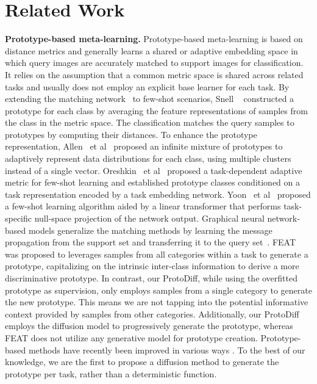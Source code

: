 
\section{Related Work}

\textbf{Prototype-based meta-learning.} 
Prototype-based meta-learning is based on distance metrics and generally learns a shared or adaptive embedding space in which query images are accurately matched to support images for classification. It relies on the assumption that a common metric space is shared across related tasks and usually does not employ an explicit base learner for each task. By extending the matching network~\cite{vinyals2016matching} to few-shot scenarios, Snell \etal~\cite{snell2017prototypical} constructed a prototype for each class by averaging the feature representations of samples from the class in the metric space. The classification matches the query samples to prototypes by computing their distances. To enhance the prototype representation, Allen \ et al~\cite {allen2019infinite} proposed an infinite mixture of prototypes to adaptively represent data distributions for each class, using multiple clusters instead of a single vector. Oreshkin \ et al~\cite {oreshkin2018tadam} proposed a task-dependent adaptive metric for few-shot learning and established prototype classes conditioned on a task representation encoded by a task embedding network. Yoon \ et al~\cite {yoon2019tapnet} proposed a few-shot learning algorithm aided by a linear transformer that performs task-specific null-space projection of the network output. Graphical neural network-based models generalize the matching methods by learning the message propagation from the support set and transferring it to the query set~\cite{garcia2018few}.  FEAT~\cite{ye2020few} was proposed to leverages samples from all categories within a task to generate a prototype, capitalizing on the intrinsic inter-class information to derive a more discriminative prototype.  In contrast, our ProtoDiff, while using the overfitted prototype as supervision, only employs samples from a single category to generate the new prototype. This means we are not tapping into the potential informative context provided by samples from other categories. Additionally, our ProtoDiff employs the diffusion model to progressively generate the prototype, whereas FEAT does not utilize any generative model for prototype creation. 
Prototype-based methods have recently been improved in various ways \cite{cao2019theoretical,triantafillou2019meta, ye2020few, zhen2020memory}. To the best of our knowledge, we are the first to propose a diffusion method to generate the prototype per task, rather than a deterministic function.



